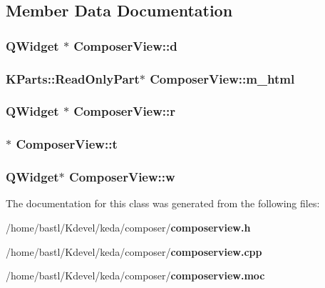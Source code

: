 \subsection{Member Data Documentation}
\subsubsection{\setlength{\rightskip}{0pt plus 5cm}QWidget $\ast$ {\bf Composer\-View::d}}\label{classComposerView_8277e0910d750195b448797616e091ad}


\subsubsection{\setlength{\rightskip}{0pt plus 5cm}KParts::Read\-Only\-Part$\ast$ {\bf Composer\-View::m\_\-html}\hspace{0.3cm}{\tt  [private]}}\label{classComposerView_73aa6a5809b4d9db65099c4f54c9e4c8}


\subsubsection{\setlength{\rightskip}{0pt plus 5cm}QWidget $\ast$ {\bf Composer\-View::r}}\label{classComposerView_4b43b0aee35624cd95b910189b3dc231}


\subsubsection{$\ast$ {\bf Composer\-View::t}}\label{classComposerView_e358efa489f58062f10dd7316b65649e}


\subsubsection{\setlength{\rightskip}{0pt plus 5cm}QWidget$\ast$ {\bf Composer\-View::w}}\label{classComposerView_f1290186a5d0b1ceab27f4e77c0c5d68}




The documentation for this class was generated from the following files:\begin{CompactItemize}
\item 
/home/bastl/Kdevel/keda/composer/{\bf composerview.h}\item 
/home/bastl/Kdevel/keda/composer/{\bf composerview.cpp}\item 
/home/bastl/Kdevel/keda/composer/{\bf composerview.moc}\end{CompactItemize}
